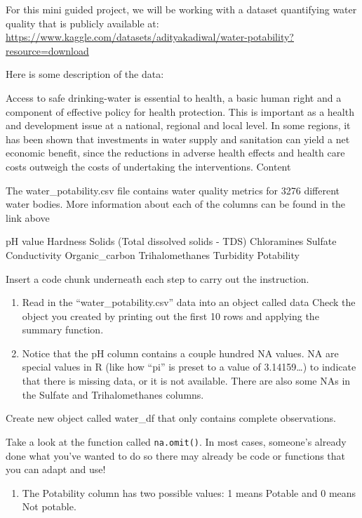 \documentclass[
]{book}
\providecommand{\tightlist}{%
  \setlength{\itemsep}{0pt}\setlength{\parskip}{0pt}}
\begin{document}
For this mini guided project, we will be working with a dataset quantifying water quality that is publicly available at: \url{https://www.kaggle.com/datasets/adityakadiwal/water-potability?resource=download}

Here is some description of the data:

Access to safe drinking-water is essential to health, a basic human right and a component of effective policy for health protection. This is important as a health and development issue at a national, regional and local level. In some regions, it has been shown that investments in water supply and sanitation can yield a net economic benefit, since the reductions in adverse health effects and health care costs outweigh the costs of undertaking the interventions.
Content

The water\_potability.csv file contains water quality metrics for 3276 different water bodies. More information about each of the columns can be found in the link above

pH value
Hardness
Solids (Total dissolved solids - TDS)
Chloramines
Sulfate
Conductivity
Organic\_carbon
Trihalomethanes
Turbidity
Potability

Insert a code chunk underneath each step to carry out the instruction.

\begin{enumerate}
\def\labelenumi{\arabic{enumi}.}
\item
  Read in the ``water\_potability.csv'' data into an object called data Check the object you created by printing out the first 10 rows and applying the summary function.
\item
  Notice that the pH column contains a couple hundred NA values. NA are special values in R (like how ``pi'' is preset to a value of 3.14159\ldots) to indicate that there is missing data, or it is not available. There are also some NAs in the Sulfate and Trihalomethanes columns.
\end{enumerate}

Create new object called water\_df that only contains complete observations.

Take a look at the function called \texttt{na.omit()}. In most cases, someone's already done what you've wanted to do so there may already be code or functions that you can adapt and use!

\begin{enumerate}
\def\labelenumi{\arabic{enumi}.}
\setcounter{enumi}{2}
\tightlist
\item
  The Potability column has two possible values: 1 means Potable and 0 means Not potable.
\end{enumerate}
\end{document}
